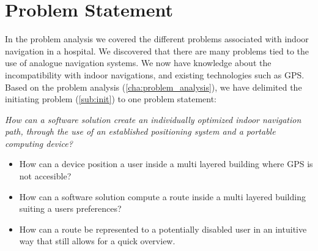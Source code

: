 \chapter{Problem Statement}




In the problem analysis we covered the different problems associated with indoor navigation in a hospital.
We discovered that there are many problems tied to the use of analogue navigation systems. We now have knowledge about the incompatibility with indoor navigations, and existing technologies such as GPS.
Based on the problem analysis (\cref{cha:problem_analysis}), we have delimited the initiating problem (\cref{sub:init}) to one problem statement:

\begin{displayquote}
    \textit{How can a software solution create an individually optimized indoor navigation path, through the use of an established positioning system and a portable computing device?}\label{sub:problem_statement}
\end{displayquote}

\begin{itemize}
	\item How can a device position a user inside a multi layered building where GPS is not accesible?
	\item How can a software solution compute a route inside a multi layered building suiting a users preferences?
	\item How can a route be represented to a potentially disabled user in an intuitive way that still allows for a quick overview.
\end{itemize}



